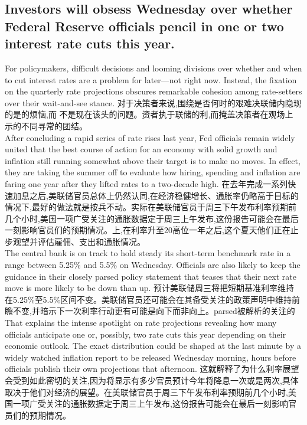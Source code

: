 \documentclass[a4paper,12pt]{article}
\begin{document}
\subsection{Investors will obsess Wednesday over whether Federal Reserve officials pencil in one or two interest rate cuts this year.}
For policymakers, difficult decisions and looming divisions over whether and when to cut interest rates are a problem for later—not right now. Instead, the fixation on the quarterly rate projections obscures remarkable cohesion among rate-setters over their wait-and-see stance. 对于决策者来说,围绕是否何时的艰难决联储内隐现的是的烦恼,⽽ 不是现在该头的问题。资者执于联储的利,⽽掩盖决策者在观场上 ⽰的不同寻常的团结。 
\\After concluding a rapid series of rate rises last year, Fed officials remain widely united that the best course of action for an economy with solid growth and inflation still running somewhat above their target is to make no moves. In effect, they are taking the summer off to evaluate how hiring, spending and inflation are faring one year after they lifted rates to a two-decade high. 在去年完成一系列快速加息之后,美联储官员总体上仍然认同,在经济稳健增长、通胀率仍略高于目标的情况下,最好的做法就是按兵不动。实际在美联储官员于周三下午发布利率预期前几个小时,美国一项广受关注的通胀数据定于周三上午发布,这份报告可能会在最后一刻影响官员们的预期情况。上,在利率升至20高位一年之后,这个夏天他们正在止步观望并评估雇佣、支出和通胀情况。
\\The central bank is on track to hold steady its short-term benchmark rate in a range between 5.25\% and 5.5\% on Wednesday. Officials are also likely to keep the guidance in their closely parsed policy statement that teases that their next rate move is more likely to be down than up. 预计美联储周三将把短期基准利率维持在5.25\%至5.5\%区间不变。美联储官员还可能会在其备受关注的政策声明中维持前瞻不变,并暗示下一次利率行动更有可能是向下而非向上。parsed被解析的关注的
\\That explains the intense spotlight on rate projections revealing how many officials anticipate one or, possibly, two rate cuts this year depending on their economic outlook. The exact distribution could be shaped at the last minute by a widely watched inflation report to be released Wednesday morning, hours before officials publish their own projections that afternoon. 这就解释了为什么利率展望会受到如此密切的关注,因为将显示有多少官员预计今年将降息一次或是两次,具体取决于他们对经济的展望。在美联储官员于周三下午发布利率预期前几个小时,美国一项广受关注的通胀数据定于周三上午发布,这份报告可能会在最后一刻影响官员们的预期情况。 
\end{document}
